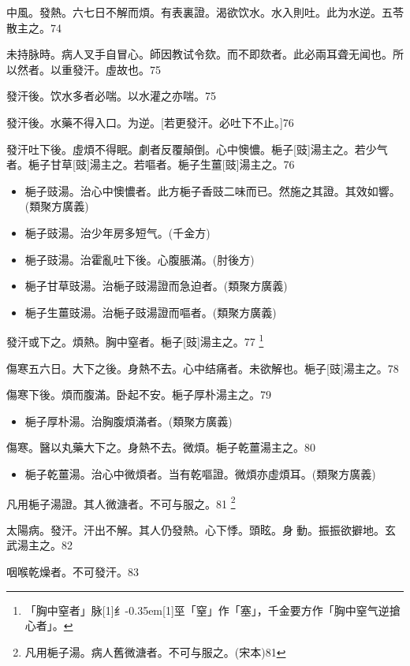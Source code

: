 \documentclass[oneside,b4paper]{ctexbook}
\begin{document}
\begin{flushleft}
中風。發熱。六七日不解而煩。有表裏證。渴欲饮水。水入則吐。此为水逆。五苓散主之。74

未持脉時。病人叉手自冒心。師因教试令欬。而不即欬者。此必兩耳聋无闻也。所以然者。以重發汗。虛故也。75

發汗後。饮水多者必喘。以水灌之亦喘。75

發汗後。水藥不得入口。为逆。[若更發汗。必吐下不止。]76

發汗吐下後。虛煩不得眠。劇者反覆顛倒。心中懊憹。梔子[豉]湯主之。若少气者。梔子甘草[豉]湯主之。若嘔者。梔子生薑[豉]湯主之。76

\begin{itemize}
\item 梔子豉湯。治心中懊憹者。此方梔子香豉二味而已。然施之其證。其效如響。(類聚方廣義)
\item 梔子豉湯。治少年房多短气。(千金方)
\item 梔子豉湯。治霍亂吐下後。心腹脹滿。(肘後方)
\item 梔子甘草豉湯。治梔子豉湯證而急迫者。(類聚方廣義)
\item 梔子生薑豉湯。治梔子豉湯證而嘔者。(類聚方廣義)
\end{itemize}

發汗或下之。煩熱。胸中窒者。梔子[豉]湯主之。77
\footnote{「胸中窒者」脉{\hbox{\scalebox{0.68}[1]{纟}\kern-0.35em\scalebox{0.64}[1]{巠}}}「窒」作「塞」，千金要方作「胸中窒气逆搶心者」。}

傷寒五六日。大下之後。身熱不去。心中结痛者。未欲解也。梔子[豉]湯主之。78

傷寒下後。煩而腹滿。卧起不安。梔子厚朴湯主之。79

\begin{itemize}
\item 梔子厚朴湯。治胸腹煩滿者。(類聚方廣義)
\end{itemize}

傷寒。醫以丸藥大下之。身熱不去。微煩。梔子乾薑湯主之。80

\begin{itemize}
\item 梔子乾薑湯。治心中微煩者。当有乾嘔證。微煩亦虛煩耳。(類聚方廣義)
\end{itemize}

凡用梔子湯證。其人微溏者。不可与服之。81
\footnote{凡用梔子湯。病人舊微溏者。不可与服之。(宋本)81}

太陽病。發汗。汗出不解。其人仍發熱。心下悸。頭眩。身{𥆧}動。振振欲擗地。玄武湯主之。82

咽喉乾燥者。不可發汗。83


\end{flushleft}
\end{document}
